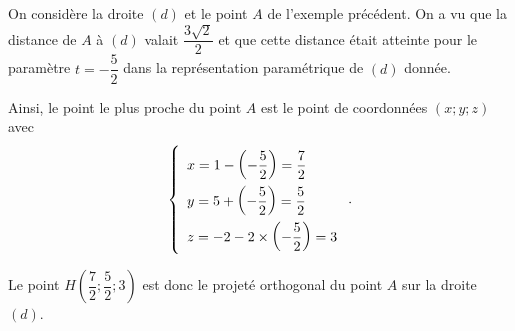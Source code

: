 \documentclass[11pt,fleqn, openany]{book} %
\begin{document}
\begin{example}On considère la droite $(d)$ et le point $A$ de l'exemple précédent. On a vu que la distance de $A$ à $(d)$ valait $\dfrac{3\sqrt{2}}{2}$ et que cette distance était atteinte pour le paramètre $t=-\dfrac{5}{2}$ dans la représentation paramétrique de $(d)$ donnée.

Ainsi, le point le plus proche du point $A$ est le point de coordonnées $(x;y;z)$ avec
\[\left\{\renewcommand{\arraystretch}{2} \begin{array}{l}x=1-\left(-\dfrac{5}{2}\right)=\dfrac{7}{2} \\ y=5+\left(-\dfrac{5}{2}\right)=\dfrac{5}{2} \\ z = -2-2 \times \left(-\dfrac{5}{2}\right)=3 \\\end{array}\right. .\]

Le point $H\left(\dfrac{7}{2};\dfrac{5}{2};3\right)$ est donc le projeté orthogonal du point $A$ sur la droite $(d)$.\end{example}
\end{document}
